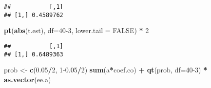 \documentclass[
]{article}
\newenvironment{Shaded}{\begin{snugshade}}{\end{snugshade}}
\newcommand{\AttributeTok}[1]{\textcolor[rgb]{0.13,0.29,0.53}{#1}}
\newcommand{\ConstantTok}[1]{\textcolor[rgb]{0.56,0.35,0.01}{#1}}
\newcommand{\DecValTok}[1]{\textcolor[rgb]{0.00,0.00,0.81}{#1}}
\newcommand{\FloatTok}[1]{\textcolor[rgb]{0.00,0.00,0.81}{#1}}
\newcommand{\FunctionTok}[1]{\textcolor[rgb]{0.13,0.29,0.53}{\textbf{#1}}}
\newcommand{\NormalTok}[1]{#1}
\newcommand{\OtherTok}[1]{\textcolor[rgb]{0.56,0.35,0.01}{#1}}
\newcommand{\SpecialCharTok}[1]{\textcolor[rgb]{0.81,0.36,0.00}{\textbf{#1}}}
\begin{document}
\begin{Shaded}
\end{Shaded}

\begin{verbatim}
##           [,1]
## [1,] 0.4589762
\end{verbatim}

\begin{Shaded}
\begin{Highlighting}[]
\FunctionTok{pt}\NormalTok{(}\FunctionTok{abs}\NormalTok{(t.est), }\AttributeTok{df=}\DecValTok{40{-}3}\NormalTok{, }\AttributeTok{lower.tail =} \ConstantTok{FALSE}\NormalTok{) }\SpecialCharTok{*} \DecValTok{2}
\end{Highlighting}
\end{Shaded}

\begin{verbatim}
##           [,1]
## [1,] 0.6489363
\end{verbatim}

\begin{Shaded}
\begin{Highlighting}[]
\NormalTok{prob }\OtherTok{\textless{}{-}} \FunctionTok{c}\NormalTok{(}\FloatTok{0.05}\SpecialCharTok{/}\DecValTok{2}\NormalTok{, }\DecValTok{1}\FloatTok{{-}0.05}\SpecialCharTok{/}\DecValTok{2}\NormalTok{)}
\FunctionTok{sum}\NormalTok{(a}\SpecialCharTok{*}\NormalTok{coef.co) }\SpecialCharTok{+} \FunctionTok{qt}\NormalTok{(prob, }\AttributeTok{df=}\DecValTok{40{-}3}\NormalTok{) }\SpecialCharTok{*} \FunctionTok{as.vector}\NormalTok{(ee.a)}
\end{Highlighting}
\end{Shaded}
\end{document}
